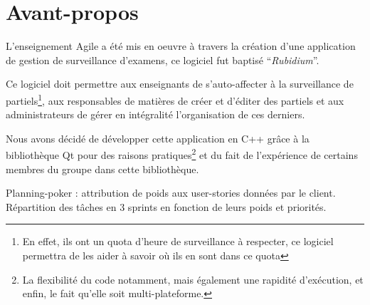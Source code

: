 \section*{Avant-propos}
L'enseignement Agile a été mis en oeuvre à travers la création d'une application de gestion de 
surveillance d'examens, ce logiciel fut baptisé ``\textit{Rubidium}''.

Ce logiciel doit permettre aux enseignants de s'auto-affecter à la surveillance de partiels\footnote{
En effet, ils ont un quota d'heure de surveillance à respecter, ce logiciel permettra de les aider à savoir où ils en sont dans ce quota}, aux responsables de matières de créer et d'éditer des partiels et aux administrateurs de gérer en intégralité l'organisation de ces derniers.

Nous avons décidé de développer cette application en C++ grâce à la bibliothèque Qt pour des raisons pratiques\footnote{La flexibilité du code notamment, mais également une rapidité d'exécution, et enfin, le fait qu'elle soit multi-plateforme.} et du fait de l'expérience de certains membres du groupe dans cette bibliothèque.

Planning-poker : attribution de poids aux user-stories données par le client.
Répartition des tâches en 3 sprints en fonction de leurs poids et priorités.

